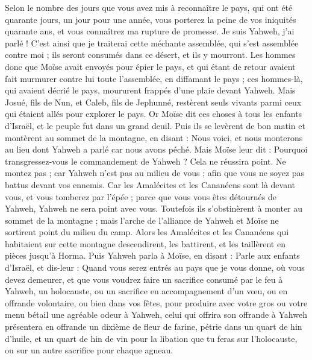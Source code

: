 \begin{multicols}{2}
Selon le nombre des jours que vous avez mis à reconnaître le pays, qui ont été quarante jours, un jour pour une année, vous porterez la peine de vos iniquités quarante ans, et vous connaîtrez ma rupture de promesse.
Je suis Yahweh, j'ai parlé ! C'est ainsi que je traiterai cette méchante assemblée, qui s'est assemblée contre moi ; ils seront consumés dans ce désert, et ils y mourront.
Les hommes donc que Moïse avait envoyés pour épier le pays, et qui étant de retour avaient fait murmurer contre lui toute l'assemblée, en diffamant le pays ;
ces hommes-là, qui avaient décrié le pays, moururent frappés d'une plaie devant Yahweh.
Mais Josué, fils de Nun, et Caleb, fils de Jephunné, restèrent seuls vivants parmi ceux qui étaient allés pour explorer le pays.
Or Moïse dit ces choses à tous les enfants d'Israël, et le peuple fut dans un grand deuil.
Puis ils se levèrent de bon matin et montèrent au sommet de la montagne, en disant : Nous voici, et nous monterons au lieu dont Yahweh a parlé car nous avons péché.
Mais Moïse leur dit : Pourquoi transgressez-vous le commandement de Yahweh ? Cela ne réussira point.
Ne montez pas ; car Yahweh n'est pas au milieu de vous ; afin que vous ne soyez pas battus devant vos ennemis.
Car les Amalécites et les Cananéens sont là devant vous, et vous tomberez par l'épée ; parce que vous vous êtes détournés de Yahweh, Yahweh ne sera point avec vous.
Toutefois ils s'obstinèrent à monter au sommet de la montagne ; mais l'arche de l'alliance de Yahweh et Moïse ne sortirent point du milieu du camp.
Alors les Amalécites et les Cananéens qui habitaient sur cette montagne descendirent, les battirent, et les taillèrent en pièces jusqu'à Horma.
\VerseOne{}Puis Yahweh parla à Moïse, en disant :
Parle aux enfants d'Israël, et dis-leur : Quand vous serez entrés au pays que je vous donne, où vous devez demeurer,
et que vous voudrez faire un sacrifice consumé par le feu à Yahweh, un holocauste, ou un sacrifice en accompagnement d'un vœu, ou en offrande volontaire, ou bien dans vos fêtes, pour produire avec votre gros ou votre menu bétail une agréable odeur à Yahweh,
celui qui offrira son offrande à Yahweh présentera en offrande un dixième de fleur de farine, pétrie dans un quart de hin d'huile,
et un quart de hin de vin pour la libation que tu feras sur l'holocauste, ou sur un autre sacrifice pour chaque agneau.

\end{multicols}
